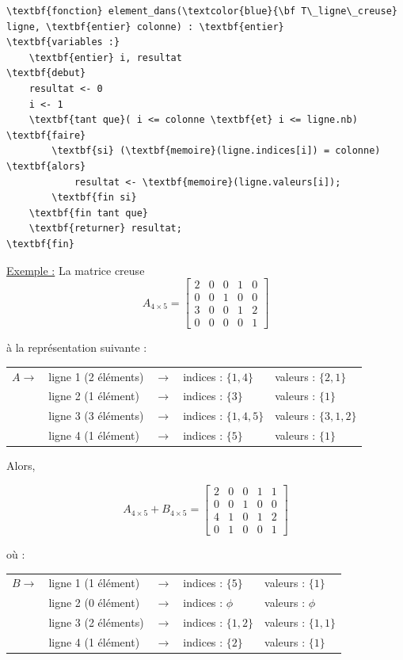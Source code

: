 \documentclass[11pt]{exam}
\begin{document}
\begin{questions}
\begin{Verbatim}
\textbf{fonction} element_dans(\textcolor{blue}{\bf T\_ligne\_creuse} ligne, \textbf{entier} colonne) : \textbf{entier}
\textbf{variables :}
	\textbf{entier} i, resultat
\textbf{debut}
    resultat <- 0
    i <- 1
    \textbf{tant que}( i <= colonne \textbf{et} i <= ligne.nb) \textbf{faire}
        \textbf{si} (\textbf{memoire}(ligne.indices[i]) = colonne) \textbf{alors}
            resultat <- \textbf{memoire}(ligne.valeurs[i]);
        \textbf{fin si}
    \textbf{fin tant que}
    \textbf{returner} resultat;
\textbf{fin}
\end{Verbatim}

\underline{Exemple :} La matrice creuse
\[
A_{4\times 5} = 
\left[ {\begin{array}{ccccc}
2 & 0 & 0 & 1 & 0\\
0 & 0 & 1 & 0 & 0\\
3 & 0 & 0 & 1 & 2\\
0 & 0 & 0 & 0 & 1
\end{array} } \right]
\]

\`a la repr\'esentation suivante :

\begin{tabular}{llcll}
$A \rightarrow$ & ligne 1 (2 \'el\'ements) & $\rightarrow$ & indices : $\{1,4\}$ & valeurs : $\{2,1\}$ \\
& ligne 2 (1 \'el\'ement) & $\rightarrow$ & indices : $\{3\}$ & valeurs : $\{1\}$ \\
& ligne 3 (3 \'el\'ements) & $\rightarrow$ & indices : $\{1,4,5\}$ & valeurs : $\{3,1,2\}$ \\
& ligne 4 (1 \'el\'ement) & $\rightarrow$ & indices : $\{5\}$ & valeurs : $\{1\}$
\end{tabular}

Alors,

\[
A_{4\times 5} + B_{4\times 5} =  
\left[ {\begin{array}{ccccc}
2 & 0 & 0 & 1 & 1\\
0 & 0 & 1 & 0 & 0\\
4 & 1 & 0 & 1 & 2\\
0 & 1 & 0 & 0 & 1
\end{array} } \right]
\]

o\`u :

\begin{tabular}{llcll}
$B \rightarrow$ & ligne 1 (1 \'el\'ement) & $\rightarrow$ & indices : $\{5\}$ & valeurs : $\{1\}$ \\
& ligne 2 (0 \'el\'ement) & $\rightarrow$ & indices : $\phi$ & valeurs : $\phi$ \\
& ligne 3 (2 \'el\'ements) & $\rightarrow$ & indices : $\{1,2\}$ & valeurs : $\{1,1\}$ \\
& ligne 4 (1 \'el\'ement) & $\rightarrow$ & indices : $\{2\}$ & valeurs : $\{1\}$
\end{tabular}
\end{questions}
\end{document}
